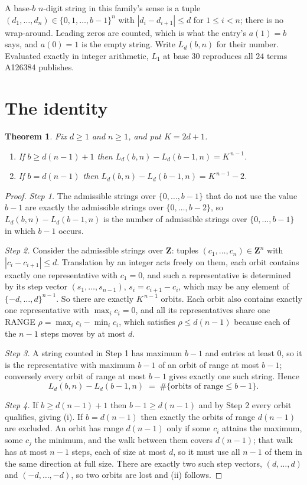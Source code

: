 \documentclass[11pt,a4paper]{article}
\theoremstyle{plain}
\newtheorem{theorem}{Theorem}
\theoremstyle{definition}
\begin{document}
A base-$b$ $n$-digit string in this family's sense is a tuple
$(d_1,\dots,d_n)\in\{0,1,\dots,b-1\}^{n}$ with $|d_i-d_{i+1}|\le d$ for $1\le i<n$; there
is no wrap-around. Leading zeros are counted, which is what the entry's $a(1)=b$ says, and
$a(0)=1$ is the empty string. Write $L_d(b,n)$ for their number. Evaluated exactly in integer
arithmetic, $L_{1}$ at base $30$ reproduces all $24$ terms A126384 publishes.

\section{The identity}

\begin{theorem}
Fix $d\ge1$ and $n\ge1$, and put $K=2d+1$.
\begin{enumerate}
\item[(i)] If $b\ge d(n-1)+1$ then $L_d(b,n)-L_d(b-1,n)=K^{\,n-1}$.
\item[(ii)] If $b=d(n-1)$ then $L_d(b,n)-L_d(b-1,n)=K^{\,n-1}-2$.
\end{enumerate}
\end{theorem}

\begin{proof}
\emph{Step 1.} The admissible strings over $\{0,\dots,b-1\}$ that do not use the value $b-1$
are exactly the admissible strings over $\{0,\dots,b-2\}$, so $L_d(b,n)-L_d(b-1,n)$ is the
number of admissible strings over $\{0,\dots,b-1\}$ in which $b-1$ occurs.

\emph{Step 2.} Consider the admissible strings over $\mathbf{Z}$: tuples
$(c_1,\dots,c_n)\in\mathbf{Z}^{n}$ with $|c_i-c_{i+1}|\le d$. Translation by an integer acts
freely on them, each orbit contains exactly one representative with $c_1=0$, and such a
representative is determined by its step vector $(s_1,\dots,s_{n-1})$, $s_i=c_{i+1}-c_i$,
which may be any element of $\{-d,\dots,d\}^{n-1}$. So there are exactly $K^{\,n-1}$ orbits.
Each orbit also contains exactly one representative with $\max_i c_i=0$, and all its
representatives share one RANGE $\rho=\max_ic_i-\min_ic_i$, which satisfies
$\rho\le d(n-1)$ because each of the $n-1$ steps moves by at most $d$.

\emph{Step 3.} A string counted in Step 1 has maximum $b-1$ and entries at least $0$, so it is
the representative with maximum $b-1$ of an orbit of range at most $b-1$; conversely every orbit
of range at most $b-1$ gives exactly one such string. Hence
\[
L_d(b,n)-L_d(b-1,n)\;=\;\#\{\text{orbits of range}\le b-1\} .
\]

\emph{Step 4.} If $b\ge d(n-1)+1$ then $b-1\ge d(n-1)$ and by Step 2 every orbit qualifies,
giving (i). If $b=d(n-1)$ then exactly the orbits of range $d(n-1)$ are excluded. An orbit has
range $d(n-1)$ only if some $c_i$ attains the maximum, some $c_j$ the minimum, and the walk
between them covers $d(n-1)$; that walk has at most $n-1$ steps, each of size at most $d$, so it
must use all $n-1$ of them in the same direction at full size. There are exactly two such step
vectors, $(d,\dots,d)$ and $(-d,\dots,-d)$, so two orbits are lost and (ii) follows.
\end{proof}
\end{document}
